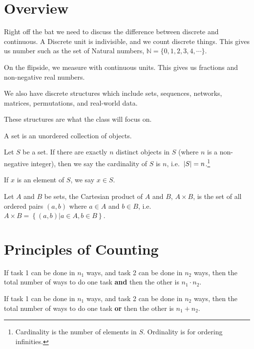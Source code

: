 \section{Overview}
Right off the bat we need to discuss the difference between discrete and continuous. A Discrete unit is indivisible, and we count discrete things. This gives us number such as the set of Natural numbers, $\mathbb{N} = \{0, 1, 2, 3, 4, \cdots\}$.

On the flipside, we measure with continuous units. This gives us fractions and non-negative real numbers.

We also have discrete structures which include sets, sequences, networks, matrices, permutations, and real-world data.

These structures are what the class will focus on.

\begin{thm}
    A set is an unordered collection of objects.

    Let $S$ be a set. If there are exactly $n$ distinct objects in $S$ (where $n$ is a non-negative integer), then we say the cardinality of $S$ is $n$, i.e.\ $\left\lvert S \right\rvert = n$.\footnote{Cardinality is the number of elements in $S$. Ordinality is for ordering infinities.}

    If $x$ is an element of $S$, we say $x \in S$.

    Let $A$ and $B$ be sets, the Cartesian product of $A$ and $B$, $A \times B$, is the set of all ordered pairs $(a, b)$ where $a \in A$ and $b \in B$, i.e.\ $A \times B = \left\{ (a, b) | a \in A, b \in B \right\}$.
\end{thm}

\section{Principles of Counting}
\begin{thm}
    If task 1 can be done in $n_1$ ways, and task 2 can be done in $n_2$ ways, then the total number of ways to do one task \textbf{and} then the other is $n_1 \cdot n_2$.
\end{thm}

\begin{thm}
    If task 1 can be done in $n_1$ ways, and task 2 can be done in $n_2$ ways, then the total number of ways to do one task \textbf{or} then the other is $n_1 + n_2$.
\end{thm}

